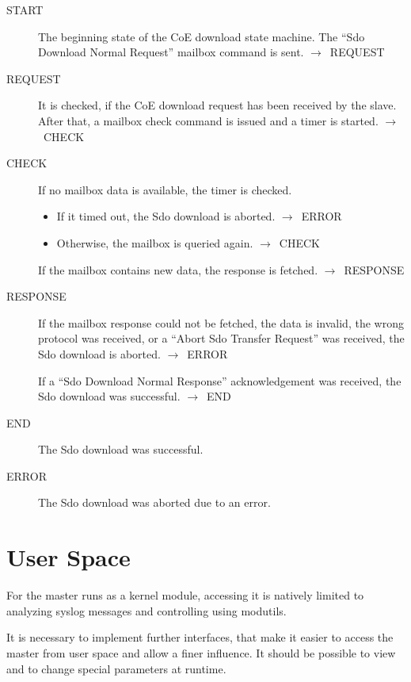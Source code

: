 \documentclass[a4paper,12pt,BCOR6mm,bibtotoc,idxtotoc]{scrbook}
\begin{document}
\begin{description}
\item[START] The beginning state of the CoE download state
  machine. The ``Sdo Download Normal Request'' mailbox command is
  sent. $\rightarrow$~REQUEST

\item[REQUEST] It is checked, if the CoE download request has been
  received by the slave. After that, a mailbox check command is issued
  and a timer is started. $\rightarrow$~CHECK

\item[CHECK] If no mailbox data is available, the timer is checked.
  \begin{itemize}
  \item If it timed out, the Sdo download is aborted.
    $\rightarrow$~ERROR
  \item Otherwise, the mailbox is queried again.
    $\rightarrow$~CHECK
  \end{itemize}

  If the mailbox contains new data, the response is fetched.
  $\rightarrow$~RESPONSE

\item[RESPONSE] If the mailbox response could not be fetched, the data
  is invalid, the wrong protocol was received, or a ``Abort Sdo
  Transfer Request'' was received, the Sdo download is aborted.
  $\rightarrow$~ERROR

  If a ``Sdo Download Normal Response'' acknowledgement was received,
  the Sdo download was successful. $\rightarrow$~END

\item[END] The Sdo download was successful.

\item[ERROR] The Sdo download was aborted due to an error.

\end{description}


\section{User Space}
\label{sec:user}

For the master runs as a kernel module, accessing it is natively
limited to analyzing syslog messages and controlling using modutils.

It is necessary to implement further interfaces, that make it easier
to access the master from user space and allow a finer influence. It
should be possible to view and to change special parameters at runtime.
\end{document}
